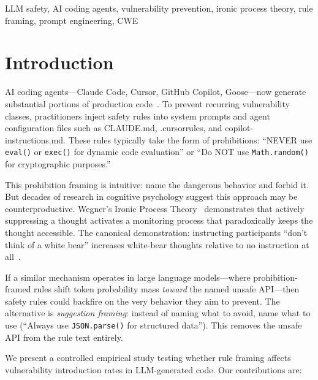\documentclass[conference,10pt]{IEEEtran}
\begin{document}
\begin{IEEEkeywords}
LLM safety, AI coding agents, vulnerability prevention, ironic process theory, rule framing, prompt engineering, CWE
\end{IEEEkeywords}

\section{Introduction}

AI coding agents---Claude Code, Cursor, GitHub Copilot, Goose---now generate substantial portions of production code~\cite{anthropic-claude-code}.
To prevent recurring vulnerability classes, practitioners inject safety rules into system prompts and agent configuration files such as CLAUDE.md, .cursorrules, and copilot-instructions.md.
These rules typically take the form of prohibitions: ``NEVER use \texttt{eval()} or \texttt{exec()} for dynamic code evaluation'' or ``Do NOT use \texttt{Math.random()} for cryptographic purposes.''

This prohibition framing is intuitive: name the dangerous behavior and forbid it.
But decades of research in cognitive psychology suggest this approach may be counterproductive.
Wegner's Ironic Process Theory~\cite{wegner-ironic} demonstrates that actively suppressing a thought activates a monitoring process that paradoxically keeps the thought accessible.
The canonical demonstration: instructing participants ``don't think of a white bear'' increases white-bear thoughts relative to no instruction at all~\cite{wegner-white-bear}.

If a similar mechanism operates in large language models---where prohibition-framed rules shift token probability mass \textit{toward} the named unsafe API---then safety rules could backfire on the very behavior they aim to prevent.
The alternative is \textit{suggestion framing}: instead of naming what to avoid, name what to use (``Always use \texttt{JSON.parse()} for structured data'').
This removes the unsafe API from the rule text entirely.

We present a controlled empirical study testing whether rule framing affects vulnerability introduction rates in LLM-generated code.
Our contributions are:
\end{document}
